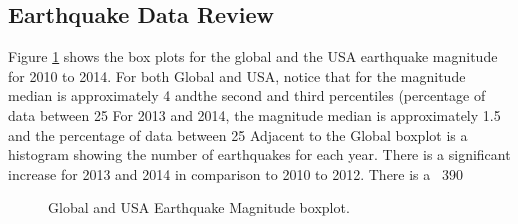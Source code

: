 \documentclass{article}
\begin{document}
\subsection{Earthquake Data Review}

Figure \ref{quakeboxplot} shows the box plots for the global and the USA earthquake magnitude for 2010 to 2014.  For both Global and USA, notice that for the magnitude median is approximately 4 andthe second and third percentiles (percentage of data between 25%
For 2013 and 2014, the magnitude median is approximately 1.5 and the percentage of data between 25%
Adjacent to the Global boxplot is a histogram showing the number of earthquakes for each year. There is a significant increase for 2013 and 2014 in comparison to 2010 to 2012.
There is a  ~390%

\begin{figure}
\begin{center}
\caption{Global and USA Earthquake Magnitude boxplot.} \label{quakeboxplot}
\end{center}
\end{figure}
\end{document}
